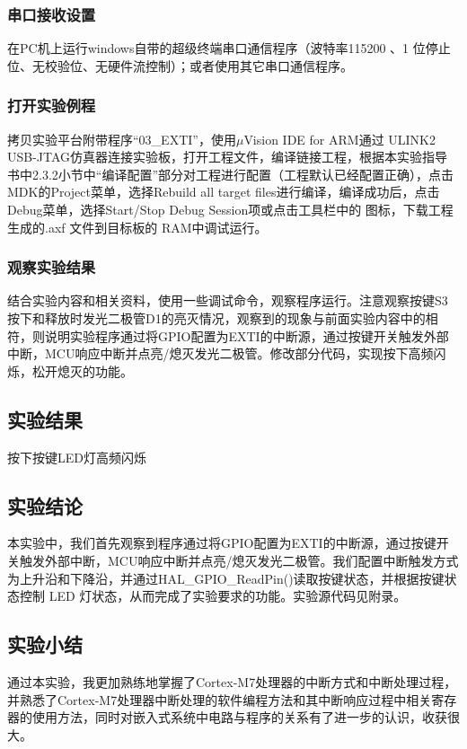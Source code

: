 ﻿\documentclass[UTF8,12pt]{article}
\begin{document}
\subsubsection{串口接收设置}
在PC机上运行windows自带的超级终端串口通信程序（波特率115200 、1 位停止位、无校验位、无硬件流控制）；或者使用其它串口通信程序。

\subsubsection{打开实验例程}
拷贝实验平台附带程序“03\_EXTI”，使用$\mu$Vision IDE for ARM通过 ULINK2 USB-JTAG仿真器连接实验板，打开工程文件，编译链接工程，根据本实验指导书中2.3.2小节中“编译配置”部分对工程进行配置（工程默认已经配置正确），点击MDK的Project菜单，选择Rebuild all target files进行编译，编译成功后，点击Debug菜单，选择Start/Stop Debug Session项或点击工具栏中的 图标，下载工程生成的.axf 文件到目标板的 RAM中调试运行。

\subsubsection{观察实验结果}
结合实验内容和相关资料，使用一些调试命令，观察程序运行。注意观察按键S3按下和释放时发光二极管D1的亮灭情况，观察到的现象与前面实验内容中的相符，则说明实验程序通过将GPIO配置为EXTI的中断源，通过按键开关触发外部中断，MCU响应中断并点亮/熄灭发光二极管。修改部分代码，实现按下高频闪烁，松开熄灭的功能。

\subsection{实验结果}

按下按键LED灯高频闪烁

\newpage


\subsection{实验结论}
本实验中，我们首先观察到程序通过将GPIO配置为EXTI的中断源，通过按键开关触发外部中断，MCU响应中断并点亮/熄灭发光二极管。我们配置中断触发方式为上升沿和下降沿，并通过HAL\_GPIO\_ReadPin()读取按键状态，并根据按键状态控制 LED 灯状态，从而完成了实验要求的功能。实验源代码见附录。

\subsection{实验小结}
通过本实验，我更加熟练地掌握了Cortex-M7处理器的中断方式和中断处理过程，并熟悉了Cortex-M7处理器中断处理的软件编程方法和其中断响应过程中相关寄存器的使用方法，同时对嵌入式系统中电路与程序的关系有了进一步的认识，收获很大。
\end{document}
